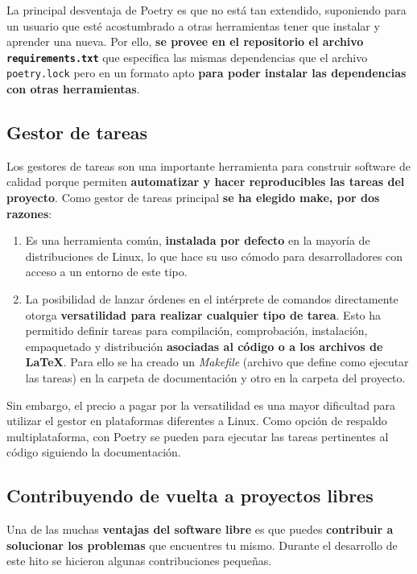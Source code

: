 La principal desventaja de Poetry es que no está tan extendido, suponiendo para un usuario que esté acostumbrado a otras herramientas tener que instalar y aprender una nueva. Por ello, \textbf{se provee en el repositorio el archivo \texttt{requirements.txt}} que especifica las mismas dependencias que el archivo \texttt{poetry.lock} pero en un formato apto \textbf{para poder instalar las dependencias con otras herramientas}.


\subsection{Gestor de tareas}

Los gestores de tareas son una importante herramienta para construir software de calidad porque permiten \textbf{automatizar y hacer reproducibles las tareas del proyecto}. Como gestor de tareas principal \textbf{se ha elegido make, por dos razones}:

\begin{enumerate}

	\item{Es una herramienta común, \textbf{instalada por defecto} en la mayoría de distribuciones de Linux, lo que hace su uso cómodo para desarrolladores con acceso a un entorno de este tipo.}

	\item{La posibilidad de lanzar órdenes en el intérprete de comandos directamente otorga \textbf{versatilidad para realizar cualquier tipo de tarea}. Esto ha permitido definir tareas para compilación, comprobación, instalación, empaquetado y distribución \textbf{asociadas al código o a los archivos de LaTeX}. Para ello se ha creado un \textit{Makefile} (archivo que define como ejecutar las tareas) en la carpeta de documentación y otro en la carpeta del proyecto.}

\end{enumerate}


Sin embargo, el precio a pagar por la versatilidad es una mayor dificultad para utilizar el gestor en plataformas diferentes a Linux. Como opción de respaldo multiplataforma, con Poetry se pueden para ejecutar las tareas pertinentes al código siguiendo la documentación.


\subsection{Contribuyendo de vuelta a proyectos libres}

Una de las muchas \textbf{ventajas del software libre} es que puedes \textbf{contribuir a solucionar los problemas} que encuentres tu mismo. Durante el desarrollo de este hito se hicieron algunas contribuciones pequeñas.


